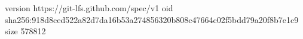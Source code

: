 version https://git-lfs.github.com/spec/v1
oid sha256:918d8ced522a82d7da16b53a274856320b808c47664c02f5bdd79a20f8b7e1c9
size 578812
